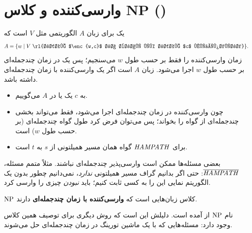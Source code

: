 \section{وارسی‌کننده و کلاس NP ()}

\begin{definition}
یک  برای زبان $A$ الگوریتمی مثل $V$ است که
\[A=\{w\st V\ \text{\rl{رشته $\enc{w,c}$ را برای یک رشته $c$ می‌پذیرد}}\}.\]
زمان وارسی‌کننده را فقط بر حسب طول $w$ می‌سنجیم؛ پس یک  در زمان چندجمله‌ای بر حسب طول $w$ اجرا می‌شود. زبان $A$  است اگر یک وارسی‌کننده با زمان چندجمله‌ای داشته باشد.
\end{definition}

\begin{itemize}
\item به $c$ یک  یا  در $A$ می‌گوییم.
\item چون وارسی‌کننده در زمان چندجمله‌ای اجرا می‌شود، فقط می‌تواند بخشی چندجمله‌ای از گواه را بخواند؛ پس می‌توان فرض کرد طول گواه چندجمله‌ای (بر حسب طول $w$) است.
\item برای $\mathit{HAMPATH}$ گواه همان مسیر همیلتونی از $s$ به $t$ است.
\end{itemize}

\begin{note}
بعضی مسئله‌ها ممکن است وارسی‌پذیر چندجمله‌ای نباشند. مثلاً متمم مسئله، $\overline{\mathit{HAMPATH}}$: حتی اگر بدانیم گراف مسیر همیلتونی \emph{ندارد}، نمی‌دانیم چطور بدون یک الگوریتم نمایی این را به کسی ثابت کنیم؛ باید \emph{نبودن} چیزی را وارسی کرد.
\end{note}

\begin{definition}[کلاس NP]
$\mathrm{NP}$ کلاس زبان‌هایی است که \textbf{وارسی‌کننده با زمان چندجمله‌ای} دارند.
\end{definition}

نام $\mathrm{NP}$ از  آمده است. دلیلش این است که روش دیگری برای توصیف همین کلاس وجود دارد: مسئله‌هایی که با یک ماشین تورینگ  در زمان چندجمله‌ای حل می‌شوند.

